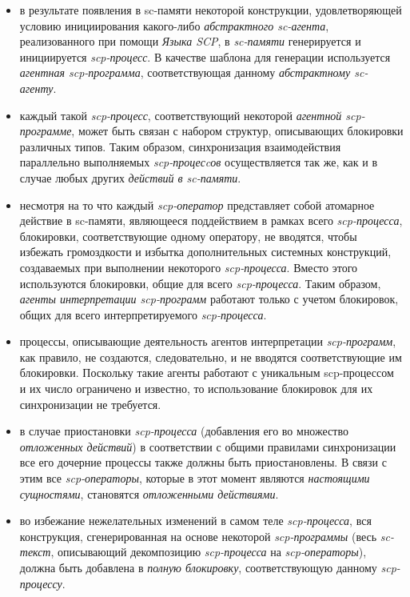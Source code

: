 \begin{itemize}
\item в результате появления в sc-памяти некоторой конструкции, удовлетворяющей условию инициирования какого-либо \textit{абстрактного sc-агента}, реализованного при помощи \textit{Языка SCP}, в \textit{sc-памяти} генерируется и инициируется \textit{scp-процесс}. В качестве шаблона для генерации используется \textit{агентная scp-программа}, соответствующая данному \textit{абстрактному sc-агенту}.
\item каждый такой \textit{scp-процесс}, соответствующий некоторой \textit{агентной \mbox{scp-программе}}, может быть связан с набором структур, описывающих блокировки различных типов. Таким образом, синхронизация взаимодействия параллельно выполняемых \textit{scp-процесcов} осуществляется так же, как и в случае любых других \textit{действий в sc-памяти}.
\item несмотря на то что каждый \textit{scp-оператор} представляет собой атомарное действие в sc-памяти, являющееся поддействием в рамках всего \textit{\mbox{scp-процесса}}, блокировки, соответствующие одному оператору, не вводятся, чтобы избежать громоздкости и избытка дополнительных системных конструкций, создаваемых при выполнении некоторого \textit{scp-процесса}. Вместо этого используются блокировки, общие для всего \textit{scp-процесса}. Таким образом, \textit{агенты интерпретации scp-программ} работают только с учетом блокировок, общих для всего интерпретируемого \textit{scp-процесса}.
\item процессы, описывающие деятельность агентов интерпретации \textit{scp-программ}, как правило, не создаются, следовательно, и не вводятся соответствующие им блокировки. Поскольку такие агенты работают с уникальным scp-процессом и их число ограничено и известно, то использование блокировок для их синхронизации не требуется.
\item в случае приостановки \textit{scp-процесса} (добавления его во множество \textit{отложенных действий}) в соответствии с общими правилами синхронизации все его дочерние процессы также должны быть	приостановлены. В связи с этим все \textit{scp-операторы}, которые в	этот момент являются \textit{настоящими сущностями}, становятся	\textit{отложенными действиями}.
\item во избежание нежелательных изменений в самом теле \textit{scp-процесса}, вся конструкция, сгенерированная на основе некоторой \textit{scp-программы} (весь \textit{sc-текст}, описывающий декомпозицию \textit{scp-процесса} на \textit{scp-операторы}), должна быть добавлена в \textit{полную блокировку}, соответствующую данному \textit{scp-процессу}.

\end{itemize}
